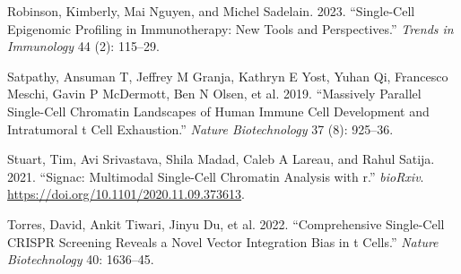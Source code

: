 \documentclass[
]{article}
\newlength{\cslhangindent}
\newenvironment{CSLReferences}[2] %
 {\begin{list}{}{%
  \setlength{\itemindent}{0pt}
  \setlength{\leftmargin}{0pt}
  \setlength{\parsep}{0pt}
  \ifodd #1
   \setlength{\leftmargin}{\cslhangindent}
   \setlength{\itemindent}{-1\cslhangindent}
  \fi
  \setlength{\itemsep}{#2\baselineskip}}}
 {\end{list}}
\begin{document}
\begin{CSLReferences}{1}{0}
Robinson, Kimberly, Mai Nguyen, and Michel Sadelain. 2023.
{``Single-Cell Epigenomic Profiling in Immunotherapy: New Tools and
Perspectives.''} \emph{Trends in Immunology} 44 (2): 115--29.

Satpathy, Ansuman T, Jeffrey M Granja, Kathryn E Yost, Yuhan Qi,
Francesco Meschi, Gavin P McDermott, Ben N Olsen, et al. 2019.
{``Massively Parallel Single-Cell Chromatin Landscapes of Human Immune
Cell Development and Intratumoral t Cell Exhaustion.''} \emph{Nature
Biotechnology} 37 (8): 925--36.

Stuart, Tim, Avi Srivastava, Shila Madad, Caleb A Lareau, and Rahul
Satija. 2021. {``Signac: Multimodal Single-Cell Chromatin Analysis with
r.''} \emph{bioRxiv}. \url{https://doi.org/10.1101/2020.11.09.373613}.

Torres, David, Ankit Tiwari, Jinyu Du, et al. 2022. {``Comprehensive
Single-Cell CRISPR Screening Reveals a Novel Vector Integration Bias in
t Cells.''} \emph{Nature Biotechnology} 40: 1636--45.

\end{CSLReferences}
\end{document}
